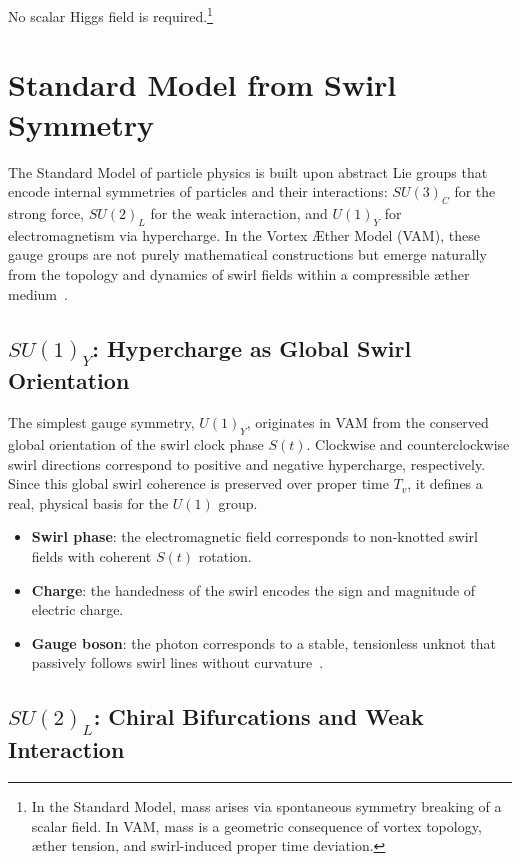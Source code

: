 \documentclass[12pt]{article}
\begin{document}
    \noindent No scalar Higgs field is required.\footnote{In the Standard Model, mass arises via spontaneous symmetry breaking of a scalar field. In VAM, mass is a geometric consequence of vortex topology, æther tension, and swirl-induced proper time deviation.}


\section{Standard Model from Swirl Symmetry}

    The Standard Model of particle physics is built upon abstract Lie groups that encode internal symmetries of particles and their interactions: \( SU(3)_C \) for the strong force, \( SU(2)_L \) for the weak interaction, and \( U(1)_Y \) for electromagnetism via hypercharge. In the Vortex \AE{}ther Model (VAM), these gauge groups are not purely mathematical constructions but emerge naturally from the topology and dynamics of swirl fields within a compressible æther medium~\cite{arnold1998topological, volovik2003universe, kleckner2013creation}.

    \subsection{\textbf{\boldmath\texorpdfstring{$SU(1)_Y$}{U(1)Y}}: Hypercharge as Global Swirl Orientation}

    The simplest gauge symmetry, \( U(1)_Y \), originates in VAM from the conserved global orientation of the swirl clock phase \( S(t) \). Clockwise and counterclockwise swirl directions correspond to positive and negative hypercharge, respectively. Since this global swirl coherence is preserved over proper time \( T_v \), it defines a real, physical basis for the \( U(1) \) group.

    \begin{itemize}
        \item \textbf{Swirl phase}: the electromagnetic field corresponds to non-knotted swirl fields with coherent \( S(t) \) rotation.
        \item \textbf{Charge}: the handedness of the swirl encodes the sign and magnitude of electric charge.
        \item \textbf{Gauge boson}: the photon corresponds to a stable, tensionless unknot that passively follows swirl lines without curvature~\cite{ranada1992knots}.
    \end{itemize}

    \subsection{\textbf{\boldmath\texorpdfstring{$SU(2)_L$}{SU(2)L}}: Chiral Bifurcations and Weak Interaction}
\end{document}
